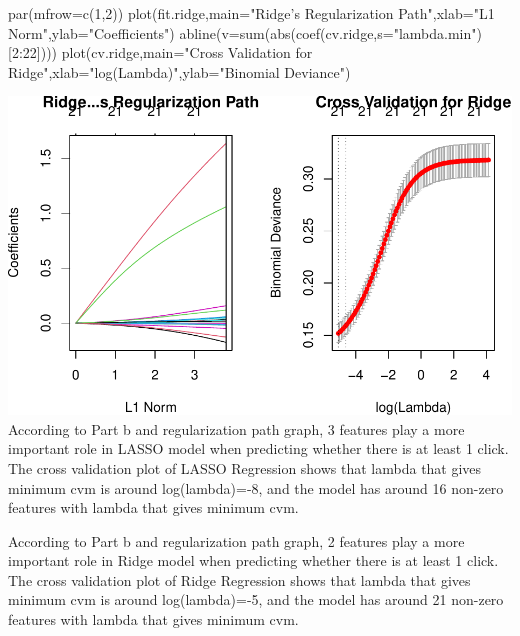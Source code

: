 \documentclass[
]{article}
\newenvironment{Shaded}{\begin{snugshade}}{\end{snugshade}}
\newcommand{\AttributeTok}[1]{\textcolor[rgb]{0.77,0.63,0.00}{#1}}
\newcommand{\DecValTok}[1]{\textcolor[rgb]{0.00,0.00,0.81}{#1}}
\newcommand{\FunctionTok}[1]{\textcolor[rgb]{0.00,0.00,0.00}{#1}}
\newcommand{\NormalTok}[1]{#1}
\newcommand{\SpecialCharTok}[1]{\textcolor[rgb]{0.00,0.00,0.00}{#1}}
\newcommand{\StringTok}[1]{\textcolor[rgb]{0.31,0.60,0.02}{#1}}
\begin{document}
\begin{Shaded}
\begin{Highlighting}[]
\FunctionTok{par}\NormalTok{(}\AttributeTok{mfrow=}\FunctionTok{c}\NormalTok{(}\DecValTok{1}\NormalTok{,}\DecValTok{2}\NormalTok{))}
\FunctionTok{plot}\NormalTok{(fit.ridge,}\AttributeTok{main=}\StringTok{"Ridge’s Regularization Path"}\NormalTok{,}\AttributeTok{xlab=}\StringTok{"L1 Norm"}\NormalTok{,}\AttributeTok{ylab=}\StringTok{"Coefficients"}\NormalTok{)}
\FunctionTok{abline}\NormalTok{(}\AttributeTok{v=}\FunctionTok{sum}\NormalTok{(}\FunctionTok{abs}\NormalTok{(}\FunctionTok{coef}\NormalTok{(cv.ridge,}\AttributeTok{s=}\StringTok{"lambda.min"}\NormalTok{)[}\DecValTok{2}\SpecialCharTok{:}\DecValTok{22}\NormalTok{])))}
\FunctionTok{plot}\NormalTok{(cv.ridge,}\AttributeTok{main=}\StringTok{"Cross Validation for Ridge"}\NormalTok{,}\AttributeTok{xlab=}\StringTok{"log(Lambda)"}\NormalTok{,}\AttributeTok{ylab=}\StringTok{"Binomial Deviance"}\NormalTok{)}
\end{Highlighting}
\end{Shaded}

\includegraphics{HW3_Wu-Yulun_files/figure-latex/unnamed-chunk-4-2.pdf}
According to Part b and regularization path graph, 3 features play a
more important role in LASSO model when predicting whether there is at
least 1 click. The cross validation plot of LASSO Regression shows that
lambda that gives minimum cvm is around log(lambda)=-8, and the model
has around 16 non-zero features with lambda that gives minimum cvm.

According to Part b and regularization path graph, 2 features play a
more important role in Ridge model when predicting whether there is at
least 1 click. The cross validation plot of Ridge Regression shows that
lambda that gives minimum cvm is around log(lambda)=-5, and the model
has around 21 non-zero features with lambda that gives minimum cvm.
\end{document}
